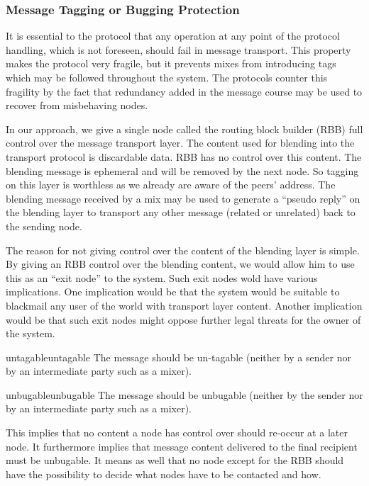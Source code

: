 \subsubsection{Message Tagging or Bugging Protection}
It is essential to the protocol that any operation at any point of the protocol handling, which is not foreseen, should fail in message transport. This property makes the protocol very fragile, but it prevents mixes from introducing tags which may be followed throughout the system. The protocols counter this fragility by the fact that redundancy added in the message course may be used to recover from misbehaving nodes.

In our approach, we give a single node called the routing block builder (RBB) full control over the message transport layer. The content used for blending into the transport protocol is discardable data. RBB has no control over this content. The blending message is ephemeral and will be removed by the next node. So tagging on this layer is worthless as we already are aware of the peers' address. The blending message received by a mix may be used to generate a ``pseudo reply'' on the blending layer to transport any other message (related or unrelated) back to the sending node. 

The reason for not giving control over the content of the blending layer is simple. By giving an RBB control over the blending content, we would allow him to use this as an ``exit node'' to the system. Such exit nodes wold have various implications. One implication would be that the system would be suitable to blackmail any user of the world with transport layer content. Another implication would be that such exit nodes might oppose further legal threats for the owner of the system.

\begin{requirement}{untagable}{untagable}
	The message should be un-tagable (neither by a sender nor by an intermediate party such as a mixer).
\end{requirement}

\begin{requirement}{unbugable}{unbugable}
	The message should be unbugable (neither by the sender nor by an intermediate party such as a mixer).
\end{requirement}

This implies that no content a node has control over should re-occur at a later node. It furthermore implies that message content delivered to the final recipient must be unbugable. It means as well that no node except for the RBB should have the possibility to decide what nodes have to be contacted and how.

